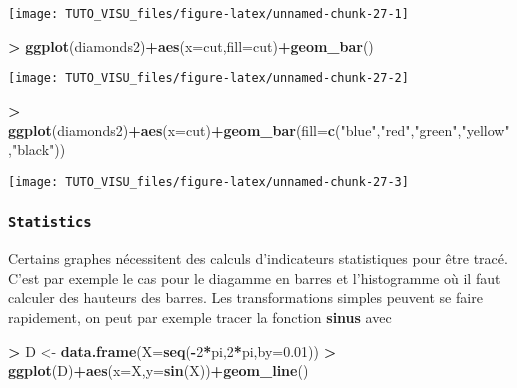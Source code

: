 \documentclass[]{article}
\newenvironment{Shaded}{\begin{snugshade}}{\end{snugshade}}
\newcommand{\DataTypeTok}[1]{\textcolor[rgb]{0.13,0.29,0.53}{#1}}
\newcommand{\DecValTok}[1]{\textcolor[rgb]{0.00,0.00,0.81}{#1}}
\newcommand{\FloatTok}[1]{\textcolor[rgb]{0.00,0.00,0.81}{#1}}
\newcommand{\KeywordTok}[1]{\textcolor[rgb]{0.13,0.29,0.53}{\textbf{#1}}}
\newcommand{\NormalTok}[1]{#1}
\newcommand{\OperatorTok}[1]{\textcolor[rgb]{0.81,0.36,0.00}{\textbf{#1}}}
\newcommand{\StringTok}[1]{\textcolor[rgb]{0.31,0.60,0.02}{#1}}
\theoremstyle{definition}
\theoremstyle{definition}
\theoremstyle{definition}
\theoremstyle{remark}
\begin{document}
\begin{center}\texttt{[image: TUTO\_VISU\_files/figure-latex/unnamed-chunk-27-1]} \end{center}

\begin{Shaded}
\begin{Highlighting}[]
\OperatorTok{>}\StringTok{ }\KeywordTok{ggplot}\NormalTok{(diamonds2)}\OperatorTok{+}\KeywordTok{aes}\NormalTok{(}\DataTypeTok{x=}\NormalTok{cut,}\DataTypeTok{fill=}\NormalTok{cut)}\OperatorTok{+}\KeywordTok{geom_bar}\NormalTok{()}
\end{Highlighting}
\end{Shaded}

\begin{center}\texttt{[image: TUTO\_VISU\_files/figure-latex/unnamed-chunk-27-2]} \end{center}

\begin{Shaded}
\begin{Highlighting}[]
\OperatorTok{>}\StringTok{ }\KeywordTok{ggplot}\NormalTok{(diamonds2)}\OperatorTok{+}\KeywordTok{aes}\NormalTok{(}\DataTypeTok{x=}\NormalTok{cut)}\OperatorTok{+}\KeywordTok{geom_bar}\NormalTok{(}\DataTypeTok{fill=}\KeywordTok{c}\NormalTok{(}\StringTok{"blue"}\NormalTok{,}\StringTok{"red"}\NormalTok{,}\StringTok{"green"}\NormalTok{,}\StringTok{"yellow"}\NormalTok{,}\StringTok{"black"}\NormalTok{))}
\end{Highlighting}
\end{Shaded}

\begin{center}\texttt{[image: TUTO\_VISU\_files/figure-latex/unnamed-chunk-27-3]} \end{center}

\hypertarget{statistics}{%
\subsubsection{\texorpdfstring{\texttt{Statistics}}{Statistics}}\label{statistics}}

Certains graphes nécessitent des calculs d'indicateurs statistiques pour être tracé. C'est par exemple le cas pour le diagamme en barres et l'histogramme où il faut calculer des hauteurs des barres. Les transformations simples peuvent se faire rapidement, on peut par exemple tracer la fonction \textbf{sinus} avec

\begin{Shaded}
\begin{Highlighting}[]
\OperatorTok{>}\StringTok{ }\NormalTok{D <-}\StringTok{ }\KeywordTok{data.frame}\NormalTok{(}\DataTypeTok{X=}\KeywordTok{seq}\NormalTok{(}\OperatorTok{-}\DecValTok{2}\OperatorTok{*}\NormalTok{pi,}\DecValTok{2}\OperatorTok{*}\NormalTok{pi,}\DataTypeTok{by=}\FloatTok{0.01}\NormalTok{))}
\OperatorTok{>}\StringTok{ }\KeywordTok{ggplot}\NormalTok{(D)}\OperatorTok{+}\KeywordTok{aes}\NormalTok{(}\DataTypeTok{x=}\NormalTok{X,}\DataTypeTok{y=}\KeywordTok{sin}\NormalTok{(X))}\OperatorTok{+}\KeywordTok{geom_line}\NormalTok{()}
\end{Highlighting}
\end{Shaded}
\end{document}
